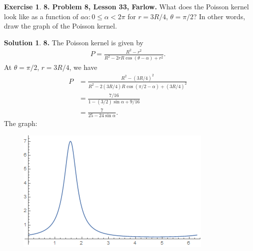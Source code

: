\documentclass{book}
\theoremstyle{definition}
\newtheorem*{exer*}{Exercise}
\newtheorem*{sln*}{Solution}
\newcommand{\f}[2]{\frac{#1}{#2}}
\begin{document}
\begin{exer*}\textbf{8. Problem 8, Lesson 33, Farlow.} What does the Poisson kernel look like as a function of $a\alpha: 0 \leq \alpha < 2\pi$ for
	$r = 3R/4$, $\theta = \pi/2$? In other words, draw the graph of the Poisson kernel.
	
	\begin{sln*}\textbf{8.} The Poisson kernel is given by
		\begin{align*}
		P = \frac{R^2 - r^2}{R^2 - 2rR\cos(\theta - \alpha) + r^2}.
		\end{align*}
		At $\theta = \pi/2$, $r = 3R/4$, we have
		\begin{align*}
		P &= \frac{R^2 - (3R/4)^2}{R^2 - 2(3R/4)R\cos(\pi/2 - \alpha) + (3R/4)^2}\\
		&= \frac{7/16}{1 - (3/2)\sin\alpha + 9/16}\\
		&= \f{7}{25 - 24\sin\alpha}.
		\end{align*}
		The graph:
		\begin{figure}[h!]
			\centering
			\includegraphics[scale=0.5]{kernel.png}
		\end{figure}
		
	\end{sln*}
	
\end{exer*}



\newpage
\end{document}
